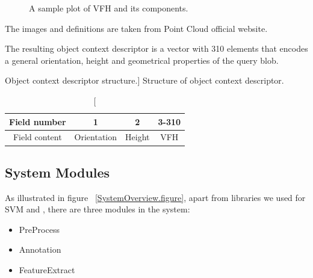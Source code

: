 \begin{figure}[t]
  \caption[VFH histogram]
  {A sample plot of VFH and its components.\cite{VFH_Definition}}
  \label{VFH_plot.figure}
\end{figure}

The images and definitions are taken from Point Cloud official website.

The resulting object context descriptor is a vector with 310 elements that encodes a general orientation, height and
geometrical properties of the query blob.

\begin{table}
\centering
\caption
[Object context descriptor structure.]
{Structure of object context descriptor.}
\label{Descriptor.table}
\begin{tabular}{|c|c|c|c|}
\hline
Field number & 1 & 2 & 3-310 \\
\hline
      Field content & Orientation & Height & VFH \\
\hline
\end{tabular}
\end{table}

% 
% 


\subsection{System Modules}
As illustrated in figure ~\ref{SystemOverview.figure}, apart from libraries we used for SVM \cite{LIBSVM} and 
\cite{li2010holistic}, there are three modules in the system:

\begin{itemize}
  \item PreProcess
  \item Annotation
  \item FeatureExtract
\end{itemize}

